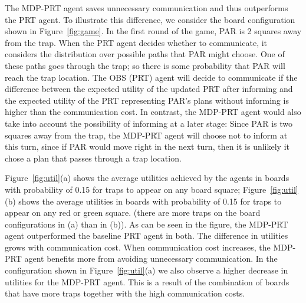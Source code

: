    \begin{table}[h]
   \centering
   \small
   \caption{The average utility for each agent and communication cost, averaged over all board instances. }
   \label{table:res}
     \vspace{-0.2cm}
   \end{table}
   
   
   The MDP-PRT agent saves unnecessary communication and thus outperforms the PRT agent. To illustrate this difference, we consider the board configuration shown in Figure~\ref{fig:game}. In the first round of the game,  PAR   
   is 2 squares away from the trap. When the PRT agent decides whether to communicate, it considers the distribution over possible paths that  PAR might choose. One of these paths goes through the trap; so there is some probability that  PAR will reach the trap location. The OBS (PRT) agent will decide to communicate if the difference between the expected utility of the updated PRT after informing and the expected utility of the PRT representing  PAR's plans without informing is higher than the communication cost. In contrast, the MDP-PRT agent would also take into account the possibility of informing at a later stage: Since PAR is two squares away from the trap, the MDP-PRT agent will choose not to inform at this turn, since if PAR would move right in the next turn, then it is unlikely it chose a plan that passes through a trap location. 


   Figure~\ref{fig:util}(a)  shows the average utilities achieved by the agents in boards with probability of 0.15 for traps to appear on any board square; Figure~\ref{fig:util}(b) shows the average utilities in  boards with probability of 0.15 for traps to appear on any red or green square. (there are more traps on the board configurations in (a) than in (b)). 
   As can be seen in the figure, the MDP-PRT agent outperformed the baseline PRT agent in both. 
   The difference in utilities grows with communication cost. When communication cost increases, the MDP-PRT agent benefits more from avoiding unnecessary  communication. In the configuration shown in Figure~\ref{fig:util}(a) we also observe a higher decrease in utilities for the MDP-PRT agent. This is a result of the combination of boards that have more traps together with the high communication costs. 


